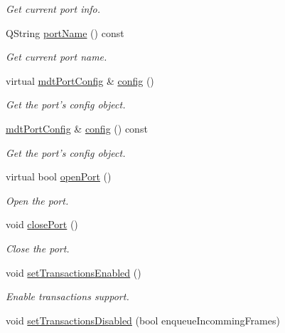 \begin{DoxyCompactItemize}
\begin{DoxyCompactList}\small\item\em Get current port info. \end{DoxyCompactList}\item 
\hypertarget{classmdt_port_manager_af4fcab6aaad98d74aeabfc972da1d406}{
QString \hyperlink{classmdt_port_manager_af4fcab6aaad98d74aeabfc972da1d406}{portName} () const }
\label{classmdt_port_manager_af4fcab6aaad98d74aeabfc972da1d406}

\begin{DoxyCompactList}\small\item\em Get current port name. \end{DoxyCompactList}\item 
virtual \hyperlink{classmdt_port_config}{mdtPortConfig} \& \hyperlink{classmdt_port_manager_a9cf3ea2da38f81682695b37448712ffd}{config} ()
\begin{DoxyCompactList}\small\item\em Get the port's config object. \end{DoxyCompactList}\item 
\hyperlink{classmdt_port_config}{mdtPortConfig} \& \hyperlink{classmdt_port_manager_a735b7dc766fc2f45fb2cf9772c4201b0}{config} () const 
\begin{DoxyCompactList}\small\item\em Get the port's config object. \end{DoxyCompactList}\item 
virtual bool \hyperlink{classmdt_port_manager_aab594613e8985590c835194efbc27b5e}{openPort} ()
\begin{DoxyCompactList}\small\item\em Open the port. \end{DoxyCompactList}\item 
void \hyperlink{classmdt_port_manager_ace8065f1f5083041ee7f65c2892bc77d}{closePort} ()
\begin{DoxyCompactList}\small\item\em Close the port. \end{DoxyCompactList}\item 
void \hyperlink{classmdt_port_manager_a7f0bc97ad55160ea09b9079dd6d816d4}{setTransactionsEnabled} ()
\begin{DoxyCompactList}\small\item\em Enable transactions support. \end{DoxyCompactList}\item 
void \hyperlink{classmdt_port_manager_a40f6d2a420d1ce103af207237c45901a}{setTransactionsDisabled} (bool enqueueIncommingFrames)

\end{DoxyCompactItemize}
